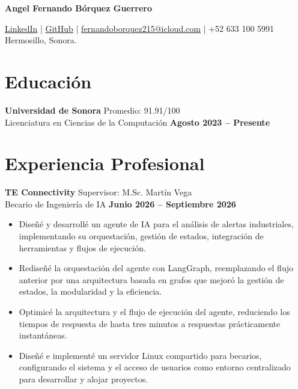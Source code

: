 \documentclass[11pt]{article}
\begin{document}
{\Huge \textbf{Angel Fernando Bórquez Guerrero}} \\
\vspace{-0.4cm}
\par \href{https://www.linkedin.com/in/fernandoborquez/}{LinkedIn} \quad | \quad
\href{https://github.com/FernyBoy}{GitHub} \quad | \quad
\href{mailto:fernandoborquez215@icloud.com}{fernandoborquez215@icloud.com} \quad | \quad
+52 633 100 5991 \\
Hermosillo, Sonora.





\section*{Educación}
\textbf{Universidad de Sonora} \hfill Promedio: 91.91/100\\
Licenciatura en Ciencias de la Computación \hfill \textbf{Agosto 2023 -- Presente}



\section*{Experiencia Profesional}
\textbf{TE Connectivity} \hfill Supervisor: M.Sc. Martín Vega \\
Becario de Ingeniería de IA \hfill \textbf{Junio 2026 -- Septiembre 2026}
\vspace{-0.3cm}
\begin{itemize}[leftmargin=*]
    \item Diseñé y desarrollé un agente de IA para el análisis de alertas industriales, implementando su orquestación, gestión de estados, integración de herramientas y flujos de ejecución.

    \vspace{-0.3cm}
    \item Rediseñé la orquestación del agente con LangGraph, reemplazando el flujo anterior por una arquitectura basada en grafos que mejoró la gestión de estados, la modularidad y la eficiencia.

    \vspace{-0.3cm}
    \item Optimicé la arquitectura y el flujo de ejecución del agente, reduciendo los tiempos de respuesta de hasta tres minutos a respuestas prácticamente instantáneas.

    \vspace{-0.3cm}
    \item Diseñé e implementé un servidor Linux compartido para becarios, configurando el sistema y el acceso de usuarios como entorno centralizado para desarrollar y alojar proyectos.
\end{itemize}
\end{document}
